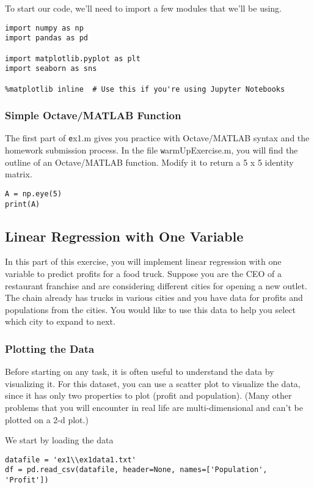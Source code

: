 To start our code, we'll need to import a few modules that we'll be using.

\begin{verbatim}
import numpy as np
import pandas as pd

import matplotlib.pyplot as plt
import seaborn as sns

%matplotlib inline	# Use this if you're using Jupyter Notebooks
\end{verbatim}


\subsubsection*{Simple Octave/MATLAB Function}
The first part of {\texttt ex1.m} gives you practice with Octave/MATLAB syntax and the homework submission process. In the file {\texttt warmUpExercise.m}, you will find the outline of an Octave/MATLAB function. Modify it to return a 5 x 5 identity matrix.

\begin{verbatim}
A = np.eye(5)
print(A)
\end{verbatim}


\subsection*{Linear Regression with One Variable}
In this part of this exercise, you will implement linear regression with one variable to predict profits for a food truck. Suppose you are the CEO of a restaurant franchise and are considering different cities for opening a new outlet. The chain already has trucks in various cities and you have data for profits and populations from the cities. You would like to use this data to help you select which city to expand to next.

\subsubsection*{Plotting the Data}
Before starting on any task, it is often useful to understand the data by visualizing it. For this dataset, you can use a scatter plot to visualize the data, since it has only two properties to plot (profit and population). (Many other problems that you will encounter in real life are multi-dimensional and can't be plotted on a 2-d plot.)

We start by loading the data
\begin{verbatim}
datafile = 'ex1\\ex1data1.txt'
df = pd.read_csv(datafile, header=None, names=['Population', 'Profit'])
\end{verbatim}

